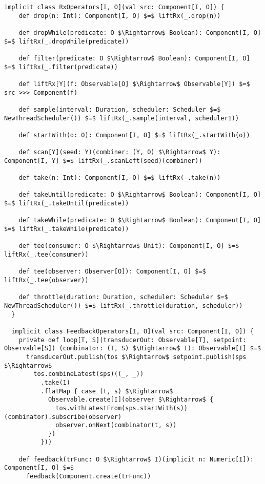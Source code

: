 \begin{lstlisting}[style=ScalaStyle, caption={Operators on \comp}, label={lst:component-operators}]
  implicit class RxOperators[I, O](val src: Component[I, O]) {
    def drop(n: Int): Component[I, O] $=$ liftRx(_.drop(n))

    def dropWhile(predicate: O $\Rightarrow$ Boolean): Component[I, O] $=$ liftRx(_.dropWhile(predicate))

    def filter(predicate: O $\Rightarrow$ Boolean): Component[I, O] $=$ liftRx(_.filter(predicate))

    def liftRx[Y](f: Observable[O] $\Rightarrow$ Observable[Y]) $=$ src >>> Component(f)

    def sample(interval: Duration, scheduler: Scheduler $=$ NewThreadScheduler()) $=$ liftRx(_.sample(interval, scheduler1))

    def startWith(o: O): Component[I, O] $=$ liftRx(_.startWith(o))

    def scan[Y](seed: Y)(combiner: (Y, O) $\Rightarrow$ Y): Component[I, Y] $=$ liftRx(_.scanLeft(seed)(combiner))

    def take(n: Int): Component[I, O] $=$ liftRx(_.take(n))

    def takeUntil(predicate: O $\Rightarrow$ Boolean): Component[I, O] $=$ liftRx(_.takeUntil(predicate))

    def takeWhile(predicate: O $\Rightarrow$ Boolean): Component[I, O] $=$ liftRx(_.takeWhile(predicate))

    def tee(consumer: O $\Rightarrow$ Unit): Component[I, O] $=$ liftRx(_.tee(consumer))

    def tee(observer: Observer[O]): Component[I, O] $=$ liftRx(_.tee(observer))

    def throttle(duration: Duration, scheduler: Scheduler $=$ NewThreadScheduler()) $=$ liftRx(_.throttle(duration, scheduler))
  }
  
  implicit class FeedbackOperators[I, O](val src: Component[I, O]) {
    private def loop[T, S](transducerOut: Observable[T], setpoint: Observable[S]) (combinator: (T, S) $\Rightarrow$ I): Observable[I] $=$
      transducerOut.publish(tos $\Rightarrow$ setpoint.publish(sps $\Rightarrow$
        tos.combineLatest(sps)((_, _))
          .take(1)
          .flatMap { case (t, s) $\Rightarrow$
            Observable.create[I](observer $\Rightarrow$ {
              tos.withLatestFrom(sps.startWith(s))(combinator).subscribe(observer)
              observer.onNext(combinator(t, s))
            })
          }))

    def feedback(trFunc: O $\Rightarrow$ I)(implicit n: Numeric[I]): Component[I, O] $=$
      feedback(Component.create(trFunc))


\end{lstlisting}
